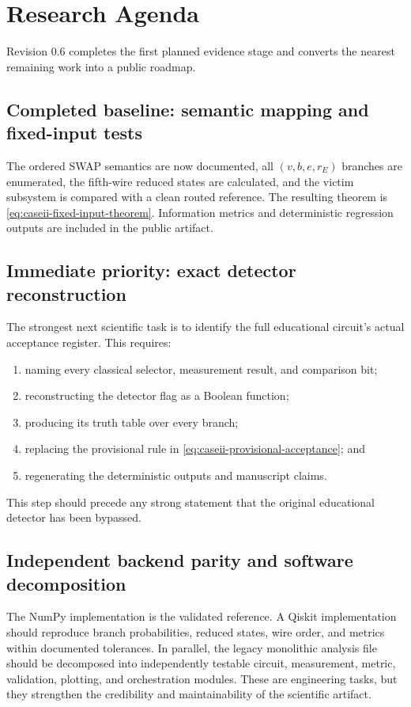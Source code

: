\section{Research Agenda}
\label{sec:research-agenda}

Revision 0.6 completes the first planned evidence stage and converts the nearest
remaining work into a public roadmap.

\subsection{Completed baseline: semantic mapping and fixed-input tests}

The ordered SWAP semantics are now documented, all $(v,b,e,r_E)$ branches are
enumerated, the fifth-wire reduced states are calculated, and the victim
subsystem is compared with a clean routed reference. The resulting theorem is
\cref{eq:caseii-fixed-input-theorem}. Information metrics and deterministic
regression outputs are included in the public artifact.

\subsection{Immediate priority: exact detector reconstruction}

The strongest next scientific task is to identify the full educational
circuit's actual acceptance register. This requires:
\begin{enumerate}
  \item naming every classical selector, measurement result, and comparison bit;
  \item reconstructing the detector flag as a Boolean function;
  \item producing its truth table over every branch;
  \item replacing the provisional rule in
  \cref{eq:caseii-provisional-acceptance}; and
  \item regenerating the deterministic outputs and manuscript claims.
\end{enumerate}
This step should precede any strong statement that the original educational
detector has been bypassed.

\subsection{Independent backend parity and software decomposition}

The NumPy implementation is the validated reference. A Qiskit implementation
should reproduce branch probabilities, reduced states, wire order, and metrics
within documented tolerances. In parallel, the legacy monolithic analysis file
should be decomposed into independently testable circuit, measurement, metric,
validation, plotting, and orchestration modules. These are engineering tasks,
but they strengthen the credibility and maintainability of the scientific
artifact.

